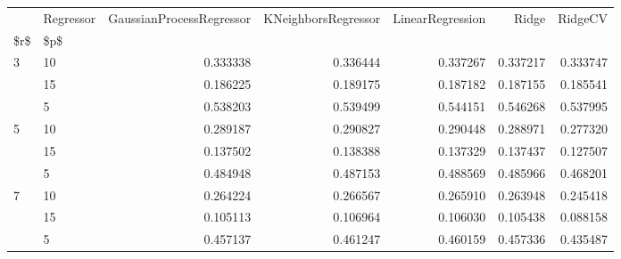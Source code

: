 \begin{tabular}{llrrrrr}
\toprule
  & Regressor &  GaussianProcessRegressor &  KNeighborsRegressor &  LinearRegression &     Ridge &   RidgeCV \\
\$r\$ & \$p\$ &                           &                      &                   &           &           \\
\midrule
3 & 10 &                  0.333338 &             0.336444 &          0.337267 &  0.337217 &  0.333747 \\
  & 15 &                  0.186225 &             0.189175 &          0.187182 &  0.187155 &  0.185541 \\
  & 5 &                  0.538203 &             0.539499 &          0.544151 &  0.546268 &  0.537995 \\
5 & 10 &                  0.289187 &             0.290827 &          0.290448 &  0.288971 &  0.277320 \\
  & 15 &                  0.137502 &             0.138388 &          0.137329 &  0.137437 &  0.127507 \\
  & 5 &                  0.484948 &             0.487153 &          0.488569 &  0.485966 &  0.468201 \\
7 & 10 &                  0.264224 &             0.266567 &          0.265910 &  0.263948 &  0.245418 \\
  & 15 &                  0.105113 &             0.106964 &          0.106030 &  0.105438 &  0.088158 \\
  & 5 &                  0.457137 &             0.461247 &          0.460159 &  0.457336 &  0.435487 \\
\bottomrule
\end{tabular}
